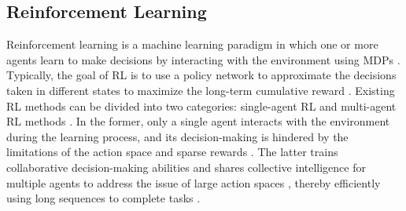 \documentclass[conference]{IEEEtran}
\begin{document}


\subsection{Reinforcement Learning}

Reinforcement learning is a machine learning paradigm in which one or more agents learn to make decisions by interacting with the environment using MDPs \cite{RLsurvey1}. Typically, the goal of RL is to use a policy network to approximate the decisions taken in different states to maximize the long-term cumulative reward \cite{RLsurvey2}. Existing RL methods can be divided into two categories: single-agent RL and multi-agent RL methods \cite{MARLsurvey1}. In the former, only a single agent interacts with the environment during the learning process, and its decision-making is hindered by the limitations of the action space and sparse rewards \cite{MARLsurvey2}. The latter trains collaborative decision-making abilities and shares collective intelligence for multiple agents to address  the issue of large action spaces \cite{MARLsurvey3}, thereby efficiently using long sequences to complete tasks \cite{MARLsurvey}.


\end{document}
